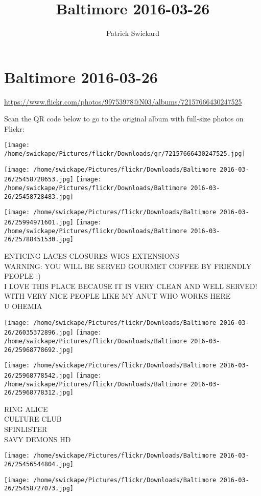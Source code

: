 \documentclass[10pt,letterpaper]{article}
\title{Baltimore 2016-03-26}
\author{Patrick Swickard}
\date{}
\begin{document}
\section*{Baltimore 2016-03-26}

\url{https://www.flickr.com/photos/99753978@N03/albums/72157666430247525}

Scan the QR code below to go to the original album with full-size photos on Flickr:

\texttt{[image: /home/swickape/Pictures/flickr/Downloads/qr/72157666430247525.jpg]}
\pagebreak

\texttt{[image: /home/swickape/Pictures/flickr/Downloads/Baltimore 2016-03-26/25458728653.jpg]}
\texttt{[image: /home/swickape/Pictures/flickr/Downloads/Baltimore 2016-03-26/25458728483.jpg]}

\texttt{[image: /home/swickape/Pictures/flickr/Downloads/Baltimore 2016-03-26/25994971601.jpg]}
\texttt{[image: /home/swickape/Pictures/flickr/Downloads/Baltimore 2016-03-26/25788451530.jpg]}

ENTICING LACES CLOSURES WIGS EXTENSIONS\\
WARNING: YOU WILL BE SERVED GOURMET COFFEE BY FRIENDLY PEOPLE :)\\
I LOVE THIS PLACE BECAUSE IT IS VERY CLEAN AND WELL SERVED!  WITH VERY NICE PEOPLE LIKE MY ANUT WHO WORKS HERE\\
U OHEMIA
\pagebreak

\texttt{[image: /home/swickape/Pictures/flickr/Downloads/Baltimore 2016-03-26/26035372896.jpg]}
\texttt{[image: /home/swickape/Pictures/flickr/Downloads/Baltimore 2016-03-26/25968778692.jpg]}

\texttt{[image: /home/swickape/Pictures/flickr/Downloads/Baltimore 2016-03-26/25968778542.jpg]}
\texttt{[image: /home/swickape/Pictures/flickr/Downloads/Baltimore 2016-03-26/25968778312.jpg]}

RING ALICE\\
CULTURE CLUB\\
SPINLISTER\\
SAVY DEMONS HD
\pagebreak

\texttt{[image: /home/swickape/Pictures/flickr/Downloads/Baltimore 2016-03-26/25456544804.jpg]}

\vspace{0.25in}
\texttt{[image: /home/swickape/Pictures/flickr/Downloads/Baltimore 2016-03-26/25458727073.jpg]}
\end{document}
